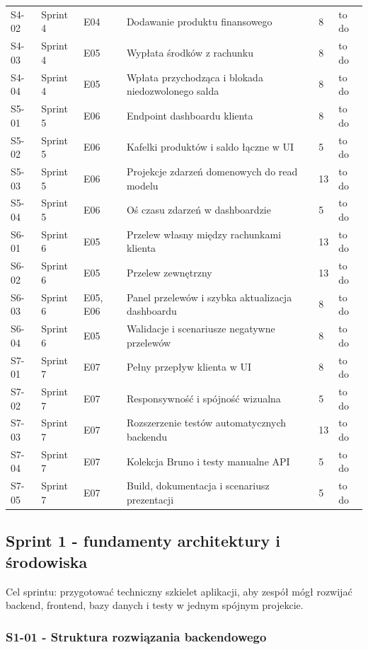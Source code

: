 \documentclass[12pt,a4paper]{article}
\begin{document}
\begin{longtable}{@{}L{0.08\textwidth}L{0.12\textwidth}L{0.10\textwidth}L{0.42\textwidth}C{0.06\textwidth}L{0.12\textwidth}@{}}
S4-02 & Sprint 4 & E04 & Dodawanie produktu finansowego & 8 & to do \\
S4-03 & Sprint 4 & E05 & Wypłata środków z rachunku & 8 & to do \\
S4-04 & Sprint 4 & E05 & Wpłata przychodząca i blokada niedozwolonego salda & 8 & to do \\
S5-01 & Sprint 5 & E06 & Endpoint dashboardu klienta & 8 & to do \\
S5-02 & Sprint 5 & E06 & Kafelki produktów i saldo łączne w UI & 5 & to do \\
S5-03 & Sprint 5 & E06 & Projekcje zdarzeń domenowych do read modelu & 13 & to do \\
S5-04 & Sprint 5 & E06 & Oś czasu zdarzeń w dashboardzie & 5 & to do \\
S6-01 & Sprint 6 & E05 & Przelew własny między rachunkami klienta & 13 & to do \\
S6-02 & Sprint 6 & E05 & Przelew zewnętrzny & 13 & to do \\
S6-03 & Sprint 6 & E05, E06 & Panel przelewów i szybka aktualizacja dashboardu & 8 & to do \\
S6-04 & Sprint 6 & E05 & Walidacje i scenariusze negatywne przelewów & 8 & to do \\
S7-01 & Sprint 7 & E07 & Pełny przepływ klienta w UI & 8 & to do \\
S7-02 & Sprint 7 & E07 & Responsywność i spójność wizualna & 5 & to do \\
S7-03 & Sprint 7 & E07 & Rozszerzenie testów automatycznych backendu & 13 & to do \\
S7-04 & Sprint 7 & E07 & Kolekcja Bruno i testy manualne API & 5 & to do \\
S7-05 & Sprint 7 & E07 & Build, dokumentacja i scenariusz prezentacji & 5 & to do \\
\bottomrule
\end{longtable}
\endgroup

\subsection*{Sprint 1 - fundamenty architektury i środowiska}

Cel sprintu: przygotować techniczny szkielet aplikacji, aby zespół mógł rozwijać backend, frontend, bazy danych i testy w jednym spójnym projekcie.

\subsubsection*{S1-01 - Struktura rozwiązania backendowego}
\end{document}
